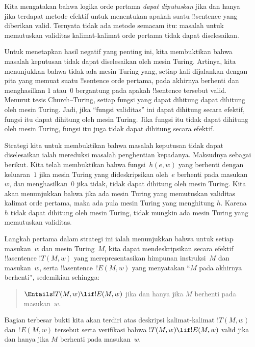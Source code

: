 \documentclass[../../../include/open-logic-section]{subfiles}
\begin{document}

Kita mengatakan bahwa logika orde pertama \emph{dapat diputuskan} jika dan
hanya jika terdapat metode efektif untuk menentukan apakah suatu
!!{sentence} yang diberikan valid. Ternyata tidak ada metode semacam itu:
masalah untuk memutuskan validitas kalimat-kalimat orde pertama tidak dapat
diselesaikan.

Untuk menetapkan hasil negatif yang penting ini, kita membuktikan bahwa
masalah keputusan tidak dapat diselesaikan oleh mesin Turing. Artinya, kita
menunjukkan bahwa tidak ada mesin Turing yang, setiap kali dijalankan dengan
pita yang memuat suatu !!{sentence} orde pertama, pada akhirnya berhenti dan
menghasilkan $1$ atau~$0$ bergantung pada apakah !!{sentence} tersebut valid.
Menurut tesis Church--Turing, setiap fungsi yang dapat dihitung dapat dihitung
oleh mesin Turing. Jadi, jika ``fungsi validitas'' ini dapat dihitung secara
efektif, fungsi itu dapat dihitung oleh mesin Turing. Jika fungsi itu tidak
dapat dihitung oleh mesin Turing, fungsi itu juga tidak dapat dihitung secara
efektif.

Strategi kita untuk membuktikan bahwa masalah keputusan tidak dapat
diselesaikan ialah mereduksi masalah penghentian kepadanya. Maksudnya sebagai
berikut. Kita telah membuktikan bahwa fungsi~$h(e,w)$ yang berhenti dengan
keluaran~$1$ jika mesin Turing yang dideskripsikan oleh~$e$ berhenti pada
masukan~$w$, dan menghasilkan~$0$ jika tidak, tidak dapat dihitung oleh mesin
Turing. Kita akan menunjukkan bahwa jika ada mesin Turing yang memutuskan
validitas kalimat orde pertama, maka ada pula mesin Turing yang menghitung
$h$. Karena $h$ tidak dapat dihitung oleh mesin Turing, tidak mungkin ada
mesin Turing yang memutuskan validitas.

Langkah pertama dalam strategi ini ialah menunjukkan bahwa untuk setiap
masukan~$w$ dan mesin Turing~$M$, kita dapat mendeskripsikan secara efektif
!!a{sentence} $!T(M, w)$ yang merepresentasikan himpunan instruksi~$M$ dan
masukan~$w$, serta !!a{sentence}~$!E(M, w)$ yang menyatakan ``$M$ pada akhirnya
berhenti'', sedemikian sehingga:
\begin{quote}
  $\Entails !T(M, w) \lif !E(M,w)$ jika dan hanya jika $M$ berhenti pada
  masukan~$w$.
\end{quote}
Bagian terbesar bukti kita akan terdiri atas deskripsi kalimat-kalimat
$!T(M, w)$ dan~$!E(M, w)$ tersebut serta verifikasi bahwa
$!T(M, w) \lif !E(M, w)$ valid jika dan hanya jika $M$ berhenti pada
masukan~$w$.
\end{document}
